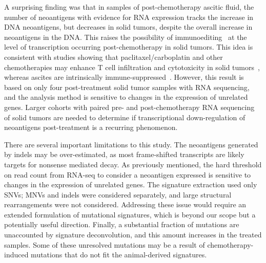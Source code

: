 A surprising finding was that in samples of post-chemotherapy ascitic fluid, the number of neoantigens with evidence for RNA expression tracks the increase in DNA neoantigens, but decreases in solid tumors, despite the overall increase in neoantigens in the DNA. This raises the possibility of immunoediting~\cite{Dunn_2002} at the level of transcription occurring post-chemotherapy in solid tumors. This idea is consistent with studies showing that paclitaxel/carboplatin and other chemotherapies may enhance T cell infiltration and cytotoxicity in solid tumors~\cite{Demaria2001,Wu_2009,Pfannenstiel_2010,Hodge_2013}, whereas ascites are intrinsically immune-suppressed~\cite{Giuntoli2009,Simpson-Abelson2013,Singel2016}. However, this result is based on only four post-treatment solid tumor samples with RNA sequencing, and the analysis method is sensitive to changes in the expression of unrelated genes. Larger cohorts with paired pre- and post-chemotherapy RNA sequencing of solid tumors are needed to determine if transcriptional down-regulation of neoantigens post-treatment is a recurring phenomenon.

There are several important limitations to this study. The neoantigens generated by indels may be over-estimated, as most frame-shifted transcripts are likely targets for nonsense mediated decay. As previously mentioned, the hard threshold on read count from RNA-seq to consider a neoantigen expressed is sensitive to changes in the expression of unrelated genes. The signature extraction used only SNVs; MNVs and indels were considered separately, and large structural rearrangements were not considered. Addressing these issue would require an extended formulation of mutational signatures, which is beyond our scope but a potentially useful direction. Finally, a substantial fraction of mutations are unaccounted by signature deconvolution, and this amount increases in the treated samples. Some of these unresolved mutations may be a result of chemotherapy-induced mutations that do not fit the animal-derived signatures. 




